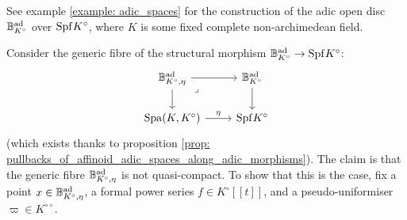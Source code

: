                     \begin{example}
                        See example \ref{example: adic_spaces} for the construction of the adic open disc $\mathbb{B}^{\mathrm{ad}}_{K^{\circ}}$ over $\mathrm{Spf} K^{\circ}$, where $K$ is some fixed complete non-archimedean field.
                    
                        Consider the generic fibre of the structural morphism $\mathbb{B}^{\mathrm{ad}}_{K^{\circ}} \to \mathrm{Spf} K^{\circ}$:
                            $$
                                \begin{tikzcd}
                                	{\B^{\ad}_{K^{\circ}, \eta}} & {\B^{\ad}_{K^{\circ}}} \\
                                	{\Spa(K, K^{\circ})} & {\Spf K^{\circ}}
                                	\arrow["\eta", from=2-1, to=2-2]
                                	\arrow[from=1-1, to=2-1]
                                	\arrow[from=1-1, to=1-2]
                                	\arrow["\lrcorner"{anchor=center, pos=0.125}, draw=none, from=1-1, to=2-2]
                                	\arrow[from=1-2, to=2-2]
                                \end{tikzcd}
                            $$
                        (which exists thanks to proposition \ref{prop: pullbacks_of_affinoid_adic_spaces_along_adic_morphisms}). The claim is that the generic fibre $\mathbb{B}^{\mathrm{ad}}_{K^{\circ}, \eta}$ is not quasi-compact. To show that this is the case, fix a point $x \in \mathbb{B}^{\mathrm{ad}}_{K^{\circ}, \eta}$, a formal power series $f \in K^{\circ}[\![t]\!]$, and a pseudo-uniformiser $\varpi \in K^{\circ \circ}$.
                    \end{example}
                    
                    \begin{remark} \label{remark: finite_pullbacks_along_non_adic_morphisms}
                        
                    \end{remark}
                    
                    \begin{remark} \label{remark: finite_pullbacks_of_non_affinoids}
                        
                    \end{remark}
                    
